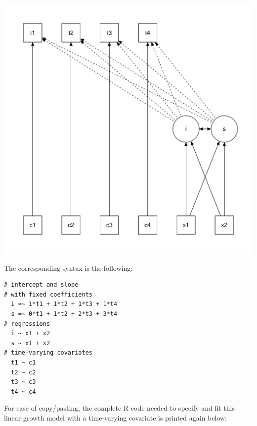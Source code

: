 \includegraphics{figure/growth-1.pdf}

The corresponding syntax is the following:

\begin{verbatim}
# intercept and slope
# with fixed coefficients
  i =~ 1*t1 + 1*t2 + 1*t3 + 1*t4
  s =~ 0*t1 + 1*t2 + 2*t3 + 3*t4
# regressions
  i ~ x1 + x2
  s ~ x1 + x2
# time-varying covariates
  t1 ~ c1
  t2 ~ c2
  t3 ~ c3
  t4 ~ c4
\end{verbatim}

For ease of copy/pasting, the complete R code needed to specify and fit
this linear growth model with a time-varying covariate is printed again
below:

\begin{Shaded}
\begin{Highlighting}[]
\StringTok{ }
\end{Highlighting}
\end{Shaded}

